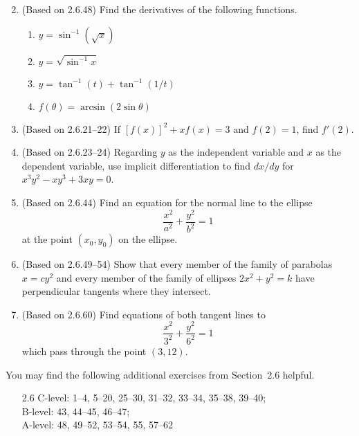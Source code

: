 \documentclass{article}
\newcommand{\ds}{\displaystyle}
\begin{document}
\begin{enumerate}
\begin{multicols}{2}
  \end{multicols}
\item (Based on 2.6.48) %
  Find the derivatives of the following functions.
  \begin{multicols}{2}
  \begin{enumerate}
  \item $\ds y = \sin^{-1}(\sqrt{x})$
  \item $\ds y = \sqrt{\sin^{-1} x}$
  \item $\ds y = \tan^{-1}(t) + \tan^{-1}(1/t)$
  \item $\ds f(\theta) = \arcsin (2\sin\theta)$
  \end{enumerate}
  \end{multicols}
\item (Based on 2.6.21--22) %
  If $[f(x)]^2 + x f(x) = 3$ and $f(2) = 1$, find $f'(2)$.
\item (Based on 2.6.23--24) %
  Regarding $y$ as the independent variable and $x$ as the
  dependent variable, use implicit differentiation to find $dx/dy$ for
  $x^3y^2-xy^3+3xy=0$.
\item (Based on 2.6.44) %
  Find an equation for the normal line to the ellipse 
  \begin{equation*}
    \frac{x^2}{a^2} + \frac{y^2}{b^2} = 1
  \end{equation*}
  at the point $(x_0,y_0)$ on the ellipse.
\item (Based on 2.6.49--54) %
  Show that every member of the family of parabolas $x=cy^2$ and
  every member of the family of ellipses $2x^2+y^2=k$ have
  perpendicular tangents where they intersect.
\item (Based on 2.6.60) %
  Find equations of both tangent lines to 
  \begin{equation*}
    \frac{x^2}{3^2} + \frac{y^2}{6^2} =1 
  \end{equation*}
  which pass through the point $(3,12)$.
\end{enumerate}

\noindent
You may find the following additional exercises from Section~2.6 helpful.
\begin{itemize}
\item[2.6] 
  C-level: 1--4, 5--20, 25--30, 31--32, 33--34, 35--38, 39--40; \\ 
  B-level: 43, 44--45, 46--47; \\
  A-level: 48, 49--52, 53--54, 55, 57--62
\end{itemize}
\end{document}
